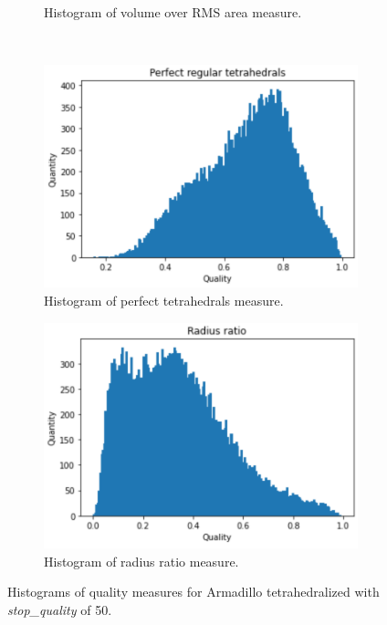\begin{figure}
\begin{subfigure}[b]{0.49\linewidth}
		\caption{Histogram of volume over RMS area measure.}
		\label{voa2}
	\end{subfigure}
	\\
	\begin{subfigure}[b]{0.49\linewidth}
		\centering
		\includegraphics[width=\linewidth]{Materials/E1/pt2}
		\caption{Histogram of perfect tetrahedrals measure.}
		\label{pt2}
	\end{subfigure}
	\hfill
	\begin{subfigure}[b]{0.49\linewidth}
		\centering
		\includegraphics[width=\linewidth]{Materials/E1/rr2}
		\caption{Histogram of radius ratio measure.}
		\label{rr2}
	\end{subfigure}
	\caption{Histograms of quality measures for Armadillo tetrahedralized with \textit{stop\_quality} of 50.}
	\label{armadillo50}
\end{figure} 
